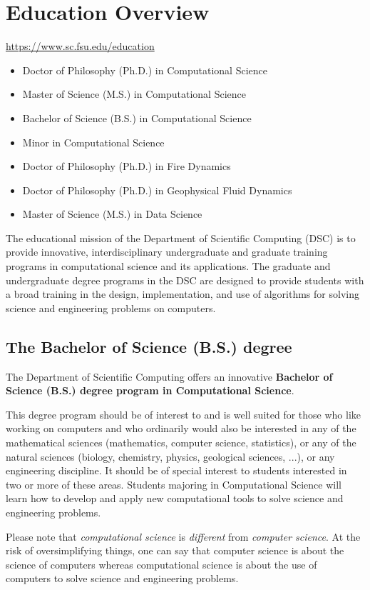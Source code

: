\documentclass[12pt,a4paper]{article}
\begin{document}
\section{Education Overview}
\url{https://www.sc.fsu.edu/education}

\begin{itemize}
    \item Doctor of Philosophy (Ph.D.) in Computational Science
    \item Master of Science (M.S.) in Computational Science
    \item Bachelor of Science (B.S.) in Computational Science
    \item Minor in Computational Science
    \item Doctor of Philosophy (Ph.D.) in Fire Dynamics
    \item Doctor of Philosophy (Ph.D.) in Geophysical Fluid Dynamics
    \item Master of Science (M.S.) in Data Science
\end{itemize}

The educational mission of the Department of Scientific Computing (DSC) is to provide innovative, interdisciplinary undergraduate and graduate training programs in computational science and its applications. The graduate and undergraduate degree programs in the DSC are designed to provide students with a broad training in the design, implementation, and use of algorithms for solving science and engineering problems on computers.

\subsection{The Bachelor of Science (B.S.) degree}
The Department of Scientific Computing offers an innovative \textbf{Bachelor of Science (B.S.) degree program in Computational Science}.

This degree program should be of interest to and is well suited for those who like working on computers and who ordinarily would also be interested in any of the mathematical sciences (mathematics, computer science, statistics), or any of the natural sciences (biology, chemistry, physics, geological sciences, ...), or any engineering discipline. It should be of special interest to students interested in two or more of these areas. Students majoring in Computational Science will learn how to develop and apply new computational tools to solve science and engineering problems.

Please note that \textit{computational science} is \textit{different} from \textit{computer science}. At the risk of oversimplifying things, one can say that computer science is about the science of computers whereas computational science is about the use of computers to solve science and engineering problems.
\end{document}

